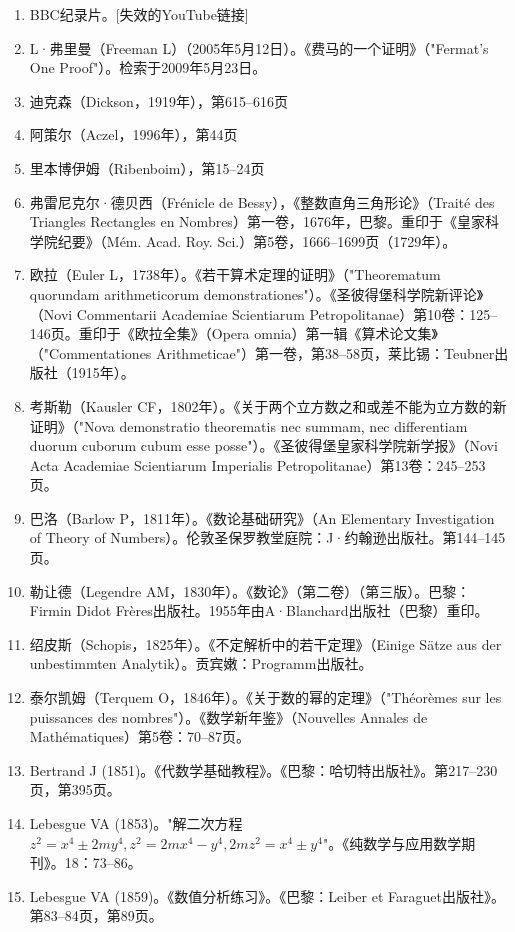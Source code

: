 \begin{enumerate}
\item BBC纪录片。[失效的YouTube链接]
\item L·弗里曼（Freeman L）（2005年5月12日）。《费马的一个证明》（"Fermat's One Proof"）。检索于2009年5月23日。
\item 迪克森（Dickson，1919年），第615–616页
\item 阿策尔（Aczel，1996年），第44页
\item 里本博伊姆（Ribenboim），第15–24页
\item 弗雷尼克尔·德贝西（Frénicle de Bessy），《整数直角三角形论》（Traité des Triangles Rectangles en Nombres）第一卷，1676年，巴黎。重印于《皇家科学院纪要》（Mém. Acad. Roy. Sci.）第5卷，1666–1699页（1729年）。
\item 欧拉（Euler L，1738年）。《若干算术定理的证明》（"Theorematum quorundam arithmeticorum demonstrationes"）。《圣彼得堡科学院新评论》（Novi Commentarii Academiae Scientiarum Petropolitanae）第10卷：125–146页。重印于《欧拉全集》（Opera omnia）第一辑《算术论文集》（"Commentationes Arithmeticae"）第一卷，第38–58页，莱比锡：Teubner出版社（1915年）。
\item 考斯勒（Kausler CF，1802年）。《关于两个立方数之和或差不能为立方数的新证明》（"Nova demonstratio theorematis nec summam, nec differentiam duorum cuborum cubum esse posse"）。《圣彼得堡皇家科学院新学报》（Novi Acta Academiae Scientiarum Imperialis Petropolitanae）第13卷：245–253页。
\item 巴洛（Barlow P，1811年）。《数论基础研究》（An Elementary Investigation of Theory of Numbers）。伦敦圣保罗教堂庭院：J·约翰逊出版社。第144–145页。
\item 勒让德（Legendre AM，1830年）。《数论》（第二卷）（第三版）。巴黎：Firmin Didot Frères出版社。1955年由A·Blanchard出版社（巴黎）重印。
\item 绍皮斯（Schopis，1825年）。《不定解析中的若干定理》（Einige Sätze aus der unbestimmten Analytik）。贡宾嫩：Programm出版社。
\item 泰尔凯姆（Terquem O，1846年）。《关于数的幂的定理》（"Théorèmes sur les puissances des nombres"）。《数学新年鉴》（Nouvelles Annales de Mathématiques）第5卷：70–87页。
\item Bertrand J (1851)。《代数学基础教程》。《巴黎：哈切特出版社》。第217–230页，第395页。  
\item Lebesgue VA (1853)。"解二次方程 \( z^2 = x^4 \pm 2my^4, z^2 = 2mx^4 - y^4, 2mz^2 = x^4 \pm y^4 \)"。《纯数学与应用数学期刊》。18：73–86。  
\item Lebesgue VA (1859)。《数值分析练习》。《巴黎：Leiber et Faraguet出版社》。第83–84页，第89页。  

\end{enumerate}
